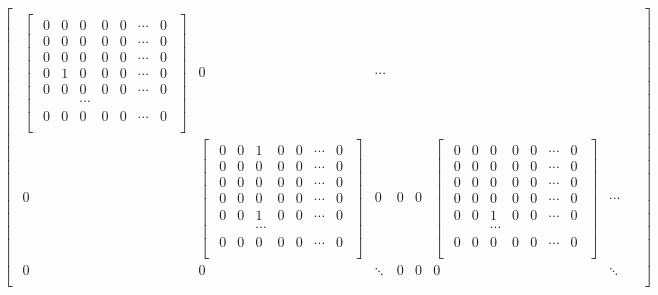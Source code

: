 \documentclass{amsc}          %
\numberwithin{equation}{section} %
\begin{document}
$$\begin{bmatrix}
\begin{smallmatrix}
\begin{bmatrix}
\begin{smallmatrix}
 0& 0& 0&0&0&\cdots&0\\
 0& 0& 0&0&0&\cdots&0\\
 0& 0& 0&0&0&\cdots&0\\
 0& 1& 0&0&0&\cdots&0\\
 0& 0& 0&0&0&\cdots&0\\
 & & \cdots& &\\
0& 0& 0& 0&0&\cdots&0\\
 \end{smallmatrix}\end{bmatrix}&
 0& \cdots&\\
 0& \begin{bmatrix}\begin{smallmatrix}
  0& 0& 1&0&0&\cdots&0\\
 0& 0& 0&0&0&\cdots&0\\
 0& 0& 0&0&0&\cdots&0\\
 0& 0& 0&0&0&\cdots&0\\
 0& 0& 1&0&0&\cdots&0\\
 & & \cdots& &\\
0& 0& 0& 0&0&\cdots&0\\
 \end{smallmatrix}\end{bmatrix}& 0& 0& 0&
 \begin{bmatrix}\begin{smallmatrix}
  0& 0& 0&0&0&\cdots&0\\
 0& 0& 0&0&0&\cdots&0\\
 0& 0& 0&0&0&\cdots&0\\
 0& 0& 0&0&0&\cdots&0\\
 0& 0& 1&0&0&\cdots&0\\
 & & \cdots& &\\
0& 0& 0& 0&0&\cdots&0\\
 \end{smallmatrix}\end{bmatrix}& \cdots&\\
 0& 0& \ddots &0 &0 &0 &\ddots \\
\end{smallmatrix}\end{bmatrix}$$
\end{document}
